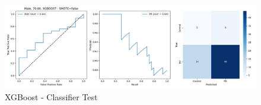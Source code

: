 \documentclass[12pt]{report}
\begin{document}
                \begin{figure}[H]
                    \centering
                    \includegraphics[width=1\textwidth]{ML/Predict/DEG/AUC/results_stratified_Male_70-80_XGBOOST_useSMOTE_False.png}
                    \caption*{XGBoost - Classifier Test}
                    \label{fig:app_xgb_males_70_80_test}
                \end{figure}
\end{document}
